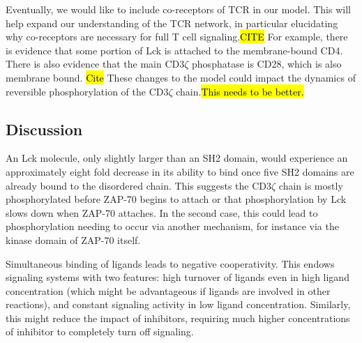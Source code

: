 \documentclass[../../AdvancementSummary.tex]{subfiles}
\begin{document}
Eventually, we would like to include co-receptors of TCR in our model. This will help expand our understanding of the TCR network, in particular elucidating why co-receptors are necessary for full T cell signaling.\hl{CITE} For example, there is evidence that some portion of Lck is attached to the membrane-bound CD4. There is also evidence that the main CD3$\zeta$ phosphatase is CD28, which is also membrane bound. \hl{Cite} These changes to the model could impact the dynamics of reversible phosphorylation of the CD3$\zeta$ chain.\hl{This needs to be better.}




\subsection{Discussion}

An Lck molecule, only slightly larger than an SH2 domain, would experience an approximately eight fold decrease in its ability to bind once five SH2 domains are already bound to the disordered chain. This suggests the CD3$\zeta$ chain is mostly phosphorylated before ZAP-70 begins to attach or that phosphorylation by Lck slows down when ZAP-70 attaches.  In the second case, this could lead to phosphorylation needing to occur via another mechanism, for instance via the kinase domain of ZAP-70 itself.  

Simultaneous binding of ligands leads to negative cooperativity. This endows signaling systems with two features: high turnover of ligands even in high ligand concentration (which might be advantageous if ligands are involved in other reactions), and constant signaling activity in low ligand concentration. Similarly, this might reduce the impact of inhibitors, requiring much higher concentrations of inhibitor to completely turn off signaling.



\end{document}
